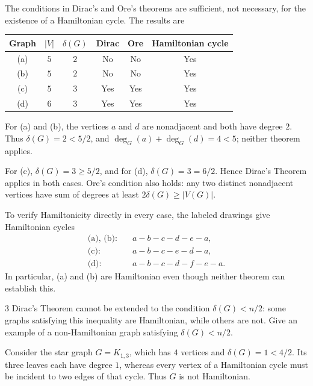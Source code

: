 \documentclass[11pt,oneside]{article}
\begin{document}
\begin{solution}
The conditions in Dirac's and Ore's theorems are sufficient, not necessary,
for the existence of a Hamiltonian cycle. The results are
\begin{center}
\begin{tabular}{@{}cccccc@{}}
\toprule
Graph & $|V|$ & $\delta(G)$ & Dirac & Ore & Hamiltonian cycle \\
\midrule
(a) & $5$ & $2$ & No & No & Yes \\
(b) & $5$ & $2$ & No & No & Yes \\
(c) & $5$ & $3$ & Yes & Yes & Yes \\
(d) & $6$ & $3$ & Yes & Yes & Yes \\
\bottomrule
\end{tabular}
\end{center}
For (a) and (b), the vertices $a$ and $d$ are nonadjacent and both have
degree $2$. Thus $\delta(G)=2<5/2$, and
$\deg_G(a)+\deg_G(d)=4<5$; neither theorem applies.

For (c), $\delta(G)=3\geq5/2$, and for (d),
$\delta(G)=3=6/2$. Hence Dirac's Theorem applies in both cases.
Ore's condition also holds: any two distinct nonadjacent vertices have
sum of degrees at least $2\delta(G)\geq|V(G)|$.

To verify Hamiltonicity directly in every case, the labeled drawings give
Hamiltonian cycles
\[
\begin{aligned}
\text{(a), (b):}\quad & a-b-c-d-e-a,\\
\text{(c):}\quad & a-b-c-e-d-a,\\
\text{(d):}\quad & a-b-c-d-f-e-a.
\end{aligned}
\]
In particular, (a) and (b) are Hamiltonian even though neither theorem
can establish this.
\end{solution}

\begin{problem}{3}
Dirac's Theorem cannot be extended to the condition $\delta(G)<n/2$:
some graphs satisfying this inequality are Hamiltonian, while others are not.
Give an example of a non-Hamiltonian graph satisfying $\delta(G)<n/2$.
\end{problem}

\begin{solution}
Consider the star graph $G=K_{1,3}$, which has $4$ vertices and
$\delta(G)=1<4/2$. Its three leaves each have degree $1$, whereas every
vertex of a Hamiltonian cycle must be incident to two edges of that cycle.
Thus $G$ is not Hamiltonian.
\end{solution}
\end{document}
